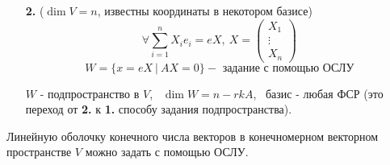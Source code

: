 \begin{enumerate}
    \item[\textbf{2.}] ($\dim V = n$, известны координаты в некотором базисе)
    $$\forall \sum \limits_{i=1}^n X_ie_i = eX , \ X = \begin{pmatrix}
    X_1 \\ \vdots \\ X_n
    \end{pmatrix}$$
    $$W = \{x = eX \ | \ AX = 0\} - \text{ задание с помощью ОСЛУ}$$   
    \begin{subtheorem}
      $W$ - подпространство в $V$,  \ $\dim W = n - rkA$, \ базис - любая ФСР (это переход от \textbf{2.} к \textbf{1.} способу задания подпространства).
    \end{subtheorem} 
  \end{enumerate}
  \begin{theorem}
    Линейную оболочку конечного числа векторов в конечномерном векторном пространстве $V$ можно задать с помощью ОСЛУ.
  \end{theorem}
